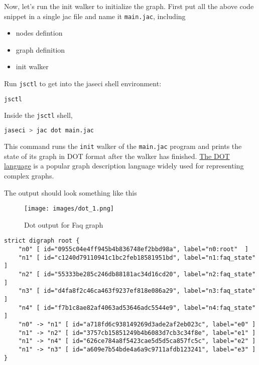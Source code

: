 Now, let's run the init walker to initialize the graph. First put all
the above code snippet in a single jac file and name it
\lstinline!main.jac!, including

\begin{itemize}
    \tightlist
    \item
          nodes defintion
    \item
          graph definition
    \item
          init walker
\end{itemize}

Run \lstinline!jsctl! to get into the jaseci shell environment:

\begin{lstlisting}[language=bash]
jsctl
\end{lstlisting}

Inside the \lstinline!jsctl! shell,

\begin{lstlisting}[language=bash]
jaseci > jac dot main.jac
\end{lstlisting}

This command runs the \lstinline!init! walker of the
\lstinline!main.jac! program and prints the state of its graph in DOT
format after the walker has finished.
\href{https://graphviz.org/doc/info/lang.html}{The DOT language} is a
popular graph description language widely used for representing complex
graphs.

The output should look something like this

\begin{figure}
    \centering
    \texttt{[image: images/dot\_1.png]}
    \caption{Dot output for Faq graph}
\end{figure}

\begin{lstlisting}
strict digraph root {
    "n0" [ id="0955c04e4ff945b4b836748ef2bbd98a", label="n0:root"  ]
    "n1" [ id="c1240d79110941c1bc2feb18581951bd", label="n1:faq_state"  ]
    "n2" [ id="55333be285c246db88181ac34d16cd20", label="n2:faq_state"  ]
    "n3" [ id="d4fa8f2c46ca463f9237ef818e086a29", label="n3:faq_state"  ]
    "n4" [ id="f7b1c8ae82af4063ad53646adc5544e9", label="n4:faq_state"  ]
    "n0" -> "n1" [ id="a718fd6c938149269d3ade2af2eb023c", label="e0" ]
    "n1" -> "n2" [ id="3757cb15851249b4b6083d7cb3c34f8e", label="e1" ]
    "n1" -> "n4" [ id="626ce784a8f5423cae5d5d5ca857fc5c", label="e2" ]
    "n1" -> "n3" [ id="a609e7b54bde4a6a9c9711afdb123241", label="e3" ]
}
\end{lstlisting}


